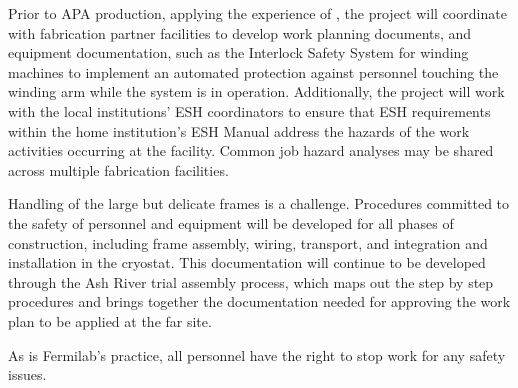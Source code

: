 Prior to APA production, applying the experience of , the project will coordinate with fabrication partner facilities to develop work planning documents, and equipment documentation, such as the Interlock Safety System for  winding machines to implement an automated protection against personnel touching the winding arm while the system is in operation. Additionally, the project will work with the local institutions' ESH coordinators to ensure that ESH requirements within the home institution's ESH Manual address the hazards of the work activities occurring at the facility. Common job hazard analyses may be shared across multiple fabrication facilities.   

Handling of the large but delicate frames is a challenge. Procedures committed to the safety of personnel and equipment will be developed for all phases of construction, including frame assembly, wiring, transport, and integration and installation in the cryostat. This documentation will continue to be developed through the Ash River trial assembly process, which maps out the step by step procedures and brings together the documentation needed for approving the work plan to be applied at the far site. 

As is Fermilab's practice, all personnel have the right to stop work for any safety issues.
